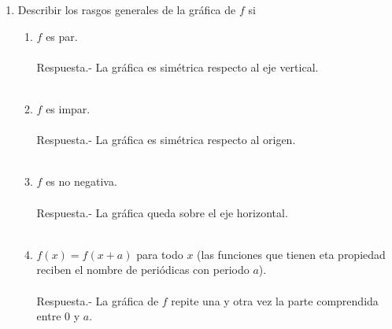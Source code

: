 \begin{enumerate}[\bfseries 1.]
\begin{enumerate}[\bfseries (i)]
    \end{enumerate}

    \item Describir los rasgos generales de la gráfica de $f$ si
    \begin{enumerate}[\bfseries (i)]

	\item $f$ es par.\\\\
	    Respuesta.-\; La gráfica es simétrica respecto al eje vertical.\\\\

	\item $f$ es impar.\\\\
	    Respuesta.-\; La gráfica es simétrica respecto al origen.\\\\

	\item $f$ es no negativa.\\\\
	    Respuesta.-\; La gráfica queda sobre el eje horizontal.\\\\

	\item $f(x)=f(x+a)$ para todo $x$ (las funciones que tienen eta propiedad reciben el nombre de periódicas con periodo $a$).\\\\
	    Respuesta.-\; La gráfica de $f$ repite una y otra vez la parte comprendida entre $0$ y $a$.\\\\

    \end{enumerate}


\end{enumerate}
